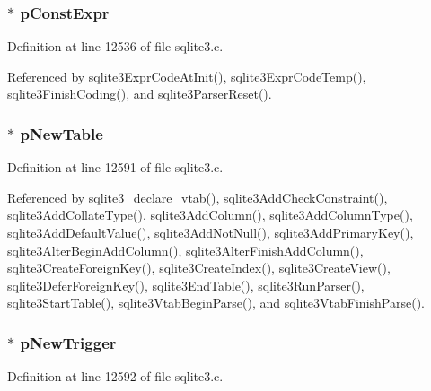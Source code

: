 \subsubsection[{p\+Const\+Expr}]{$\ast$ p\+Const\+Expr}\label{struct_parse_a15a4706ea881fbe875ab67f3ebd5f952}


Definition at line 12536 of file sqlite3.\+c.



Referenced by sqlite3\+Expr\+Code\+At\+Init(), sqlite3\+Expr\+Code\+Temp(), sqlite3\+Finish\+Coding(), and sqlite3\+Parser\+Reset().

\hypertarget{struct_parse_ae0a32c951e7d0c8ae0f96529a5dba80f}{}
\subsubsection[{p\+New\+Table}]{$\ast$ p\+New\+Table}\label{struct_parse_ae0a32c951e7d0c8ae0f96529a5dba80f}


Definition at line 12591 of file sqlite3.\+c.



Referenced by sqlite3\+\_\+declare\+\_\+vtab(), sqlite3\+Add\+Check\+Constraint(), sqlite3\+Add\+Collate\+Type(), sqlite3\+Add\+Column(), sqlite3\+Add\+Column\+Type(), sqlite3\+Add\+Default\+Value(), sqlite3\+Add\+Not\+Null(), sqlite3\+Add\+Primary\+Key(), sqlite3\+Alter\+Begin\+Add\+Column(), sqlite3\+Alter\+Finish\+Add\+Column(), sqlite3\+Create\+Foreign\+Key(), sqlite3\+Create\+Index(), sqlite3\+Create\+View(), sqlite3\+Defer\+Foreign\+Key(), sqlite3\+End\+Table(), sqlite3\+Run\+Parser(), sqlite3\+Start\+Table(), sqlite3\+Vtab\+Begin\+Parse(), and sqlite3\+Vtab\+Finish\+Parse().

\hypertarget{struct_parse_a5c343988d894c6f7b44b19d76cdd72d4}{}
\subsubsection[{p\+New\+Trigger}]{$\ast$ p\+New\+Trigger}\label{struct_parse_a5c343988d894c6f7b44b19d76cdd72d4}


Definition at line 12592 of file sqlite3.\+c.



